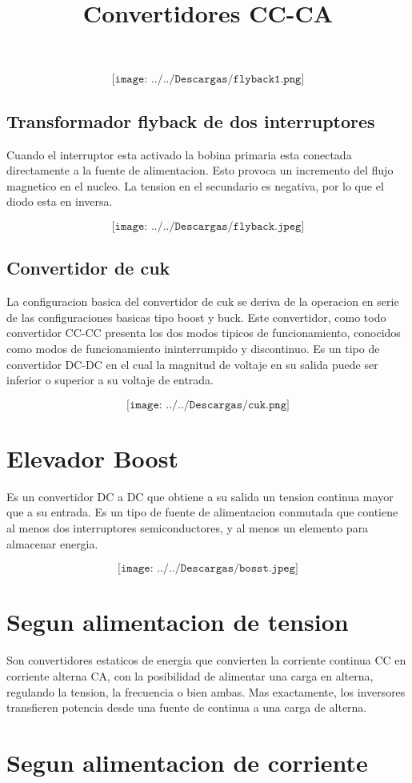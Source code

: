 \documentclass[12pt,a4paper]{report}
\begin{document}
$$\texttt{[image: ../../Descargas/flyback1.png]} $$

\subsection{Transformador flyback de dos interruptores}
Cuando el interruptor esta activado la bobina primaria esta conectada directamente a la fuente de alimentacion. Esto provoca un incremento del flujo magnetico en el nucleo.
La tension en el secundario es negativa, por lo que el diodo esta en inversa.

$$\texttt{[image: ../../Descargas/flyback.jpeg]}$$ 

\subsection{Convertidor de cuk}
La configuracion basica del convertidor de cuk se deriva de la operacion en serie de las configuraciones basicas tipo boost y buck. 
Este convertidor, como todo convertidor CC-CC presenta los dos modos tipicos de funcionamiento, conocidos como modos de funcionamiento ininterrumpido y discontinuo.
Es un tipo de convertidor DC-DC en el cual la magnitud de voltaje en su salida puede ser inferior o superior a su voltaje de entrada.

$$\texttt{[image: ../../Descargas/cuk.png]} $$
\section{Elevador Boost}
Es un convertidor DC a DC que obtiene a su salida un tension continua mayor que a su entrada.
Es un tipo de fuente de alimentacion conmutada que contiene al menos dos interruptores semiconductores, y al menos un elemento para almacenar energia.

$$\texttt{[image: ../../Descargas/bosst.jpeg]}$$

\newpage
\title{Convertidores CC-CA}
\section{Segun alimentacion de tension}
Son convertidores estaticos de energia que convierten la corriente continua CC en corriente alterna CA, con la posibilidad de alimentar una carga en alterna, regulando la tension, la frecuencia o bien ambas. Mas exactamente, los inversores transfieren potencia desde una fuente de continua a una carga de alterna.
\section{Segun alimentacion de corriente}
\end{document}
